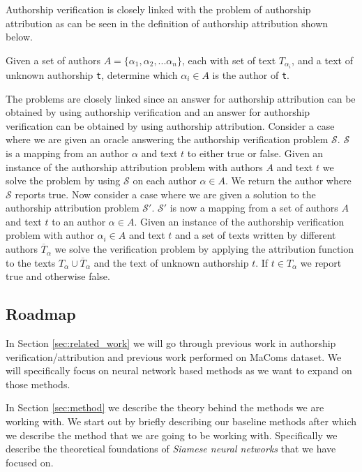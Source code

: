 Authorship verification is closely linked with the problem of authorship
attribution as can be seen in the definition of authorship attribution shown
below.

\begin{definition}

    Given a set of authors $A = \{\alpha_1, \alpha_2,...\alpha_n\}$, each with
    set of text $T_{\alpha_i}$, and a text of unknown authorship \texttt{t},
    determine which $\alpha_i \in A$ is the author of \texttt{t}.

\end{definition}

The problems are closely linked since an answer for authorship attribution
can be obtained by using authorship verification and an answer for authorship
verification can be obtained by using authorship attribution. Consider a case
where we are given an oracle answering the authorship verification problem
$\mathcal{S}$. $\mathcal{S}$ is a mapping from an author $\alpha$ and text $t$
to either true or false. Given an instance of the authorship attribution problem
with authors $A$ and text $t$ we solve the problem by using $\mathcal{S}$ on
each author $\alpha \in A$. We return the author where $\mathcal{S}$ reports
true. Now consider a case where we are given a solution to the authorship
attribution problem $\mathcal{S}'$. $\mathcal{S}'$ is now a mapping from a set
of authors $A$ and text $t$ to an author $\alpha \in A$. Given an instance of
the authorship verification problem with author $\alpha_i \in A$ and text $t$
and a set of texts written by different authors $\overline{T}_{\alpha}$ we solve
the verification problem by applying the attribution function to the texts
$T_{\alpha} \cup \overline{T}_{\alpha}$ and the text of unknown authorship $t$.
If $t \in T_{\alpha}$ we report true and otherwise false.


\subsection{Roadmap}

In Section \ref{sec:related_work} we will go through previous work in authorship
verification/attribution and previous work performed on MaComs dataset. We will
specifically focus on neural network based methods as we want to expand on those
methods.

In Section \ref{sec:method} we describe the theory behind the methods we are
working with. We start out by briefly describing our baseline methods after
which we describe the method that we are going to be working with. Specifically
we describe the theoretical foundations of \textit{Siamese neural networks} that
we have focused on.

